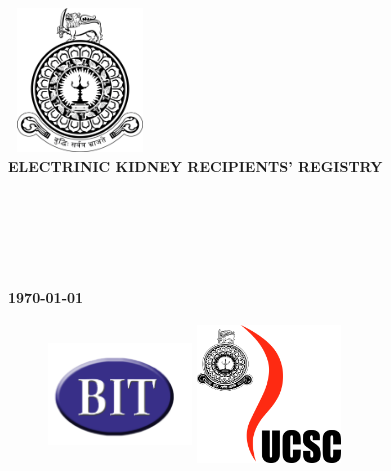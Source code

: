 \documentclass[12pt,a4paper]{report}
\begin{document}
\begin{titlepage}


\center %
{
\includegraphics[width=1.5in,height=1.5in,keepaspectratio]{logo.png}\\[0.5cm]
\fontsize{20pt}{30}\selectfont \textbf{\uppercase{ELECTRINIC KIDNEY RECIPIENTS' REGISTRY}}\\[1.5cm]
\fontsize{16pt}{24}\selectfont{B GNANAKEETHAN} \\
\fontsize{16pt}{24}\selectfont{R1812154} \\
\fontsize{16pt}{24}\selectfont{18121548} \\[1cm]

\fontsize{16pt}{24}\selectfont{Name of the Supervisor:} \\[0.5cm]
\fontsize{16pt}{24}\selectfont{Ms. B. Yaalini} \\[0.5cm]


\vspace*{\fill}

\fontsize{16pt}{24}\selectfont\textbf{\monthyeardate\today} \\[0.5cm]


\vspace*{\fill}


\begin{figure}[!h]
  \centering
  \begin{minipage}[b]{0.2\textwidth}
    \includegraphics[width=1.5in,height=1.5in,keepaspectratio]{bit-logo.png}
  \end{minipage}
  \hfill
  \begin{minipage}[b]{0.2\textwidth}
    \includegraphics[width=1.5in,height=1.5in,keepaspectratio]{ucsc-logo.jpg}
  \end{minipage}
\end{figure}

}
\end{titlepage}
\end{document}
